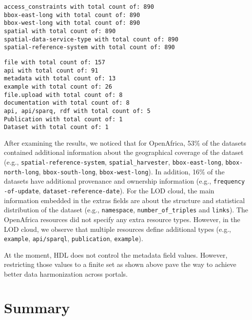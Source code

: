 \begin{lstlisting}
access_constraints with total count of: 890
bbox-east-long with total count of: 890
bbox-west-long with total count of: 890
spatial with total count of: 890
spatial-data-service-type with total count of: 890
spatial-reference-system with total count of: 890
\end{lstlisting}

\begin{lstlisting}
file with total count of: 157
api with total count of: 91
metadata with total count of: 13
example with total count of: 26
file.upload with total count of: 8
documentation with total count of: 8
api, api/sparq, rdf with total count of: 5
Publication with total count of: 1
Dataset with total count of: 1
\end{lstlisting}

After examining the results, we noticed that for OpenAfrica, 53\% of the datasets contained additional information about the geographical coverage of the dataset (e.g., \texttt{spatial-reference-system}, \texttt{spatial\_harvester}, \texttt{bbox-east-long}, \texttt{bbox-north-long}, \texttt{bbox-south-long}, \texttt{bbox-west-long}). In addition, 16\% of the datasets have additional provenance and ownership information (e.g., \texttt{frequency\\-of-update}, \texttt{dataset-reference-date}). For the LOD cloud, the main information embedded in the extras fields are about the structure and statistical distribution of the dataset (e.g., \texttt{namespace}, \texttt{number\_of\_triples} and \texttt{links}). The OpenAfrica resources did not specify any extra resource types. However, in the LOD cloud, we observe that multiple resources define additional types (e.g., \texttt{example}, \texttt{api/sparql}, \texttt{publication}, \texttt{example}).

At the moment, HDL does not control the metadata field values. However, restricting those values to a finite set as shown above pave the way to achieve better data harmonization across portals.

\section{Summary}
\label{section:hdl_summary}


